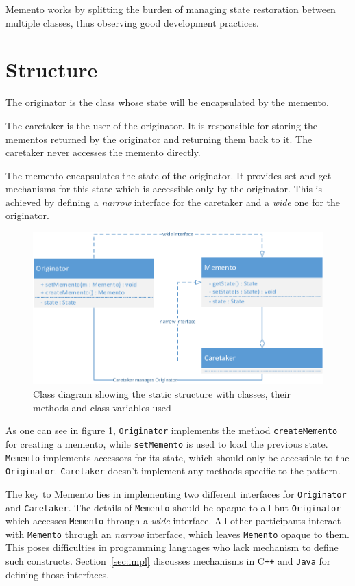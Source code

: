 \documentclass[11pt, a4paper, twoside]{article}
\def\cpp{C{}\texttt{++}}
\begin{document}
	 Memento works by splitting the burden of managing state restoration between multiple classes, thus observing good development practices.
	 	
	\section{Structure}
	The originator is the class whose state will be encapsulated by the memento.
	
	The caretaker is the user of the originator. It is responsible for storing the mementos returned by the originator and returning them back to it. The caretaker never accesses the memento directly.
	
	The memento encapsulates the state of the originator. It provides set and get mechanisms for this state which is accessible only by the originator. This is achieved by defining a \emph{narrow} interface for the caretaker and a \emph{wide} one for the originator.
	
	\begin{figure}[htb]
		\begin{center}
			\includegraphics[width=\textwidth]{class_diagram.pdf}
			\caption{Class diagram showing the static structure with classes, their methods and class variables used}
			\label{fig:class}
		\end{center}
	\end{figure}
	
	As one can see in figure \ref{fig:class}, \verb|Originator| implements the method \verb|createMemento| for creating a memento, while \verb|setMemento| is used to load the previous state. \verb|Memento| implements accessors for its state, which should only be accessible to the \verb|Originator|. \verb|Caretaker| doesn't implement any methods specific to the pattern.
	
	The key to Memento lies in implementing two different interfaces for \verb|Originator| and \verb|Caretaker|. The details of \verb|Memento| should be opaque to all but \verb|Originator| which accesses \verb|Memento| through a \emph{wide} interface. All other participants interact with \verb|Memento| through an \emph{narrow} interface, which leaves \verb|Memento| opaque to them. This poses difficulties in programming languages who lack mechanism to define such constructs. Section~\ref{sec:impl} discusses mechanisms in \cpp{} and \verb|Java| for defining those interfaces.
	
\end{document}
